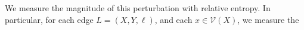 \documentclass{article}
\theoremstyle{plain}
\theoremstyle{definition}
\theoremstyle{remark}
\newcommand\mat[1]{\mathbf{#1}}
\newcommand{\bp}[1][L]{\mat{p}_{\!_{#1}\!}}
\newcommand{\V}{\mathcal V}
\numberwithin{equation}{section}
\begin{document}
%
	We measure the magnitude of this perturbation with relative
                entropy.
                          In particular, for each edge $L =
		       (X,Y, \ell)$, and each $x \in \V(X)$, we measure the
\end{document}
